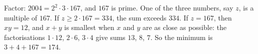 Factor: $2004=2^2\cdot3\cdot167$, and $167$ is prime. One of the three numbers, say $z$, is a multiple of $167$. If $z\ge2\cdot167=334$, the sum exceeds $334$. If $z=167$, then $xy=12$, and $x+y$ is smallest when $x$ and $y$ are as close as possible: the factorisations $1\cdot12$, $2\cdot6$, $3\cdot4$ give sums $13$, $8$, $7$. So the minimum is $3+4+167=\boxed{174}$.
